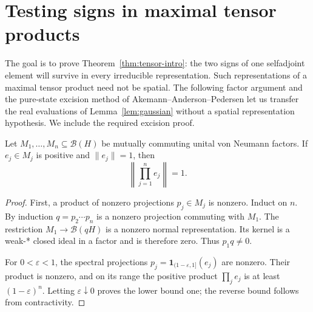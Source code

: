 \section{Testing signs in maximal tensor products}
\label{sec:tensor}
The goal is to prove Theorem~\ref{thm:tensor-intro}: the two signs of
one selfadjoint element will survive in every irreducible representation.
Such representations of a maximal tensor product need not be spatial.
The following factor argument and the pure-state excision method of
Akemann--Anderson--Pedersen \cite[Proposition~2.2]{AAP} let us transfer
the real evaluations of Lemma~\ref{lem:gaussian} without a spatial
representation hypothesis. We include the required excision proof.

\begin{lemma}\label{lem:factors}
Let \(M_1,\ldots,M_n\subseteq\mathcal B(H)\) be mutually commuting unital von Neumann factors. If \(e_j\in M_j\) is positive and \(\|e_j\|=1\), then
\[
 \left\|\prod_{j=1}^ne_j\right\|=1.
\]
\end{lemma}
\begin{proof}
First, a product of nonzero projections \(p_j\in M_j\) is nonzero. Induct on \(n\). By induction \(q=p_2\cdots p_n\) is a nonzero projection commuting with \(M_1\). The restriction \(M_1\to\mathcal B(qH)\) is a nonzero normal representation. Its kernel is a weak-* closed ideal in a factor and is therefore zero. Thus \(p_1q\ne0\).

For \(0<\varepsilon<1\), the spectral projections
\(p_j=\mathbf1_{(1-\varepsilon,1]}(e_j)\) are nonzero. Their product is nonzero, and on its range the positive product \(\prod_j e_j\) is at least \((1-\varepsilon)^n\). Letting \(\varepsilon\downarrow0\) proves the lower bound one; the reverse bound follows from contractivity.
\end{proof}

